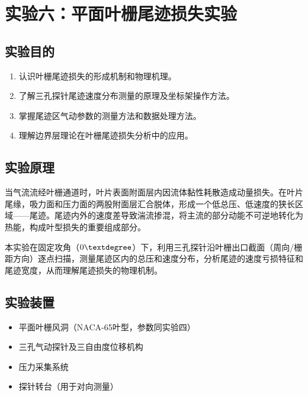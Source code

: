 
\section{实验六：平面叶栅尾迹损失实验}

\subsection{实验目的}

\begin{enumerate}
    \item 认识叶栅尾迹损失的形成机制和物理机理。
    \item 了解三孔探针尾迹速度分布测量的原理及坐标架操作方法。
    \item 掌握尾迹区气动参数的测量方法和数据处理方法。
    \item 理解边界层理论在叶栅尾迹损失分析中的应用。
\end{enumerate}

\subsection{实验原理}

当气流流经叶栅通道时，叶片表面附面层内因流体黏性耗散造成动量损失。在叶片尾缘，吸力面和压力面的两股附面层汇合脱体，形成一个低总压、低速度的狭长区域——尾迹。尾迹内外的速度差导致湍流掺混，将主流的部分动能不可逆地转化为热能，构成叶型损失的重要组成部分。

本实验在固定攻角（$0\textdegree$）下，利用三孔探针沿叶栅出口截面（周向/栅距方向）逐点扫描，测量尾迹区内的总压和速度分布，分析尾迹的速度亏损特征和尾迹宽度，从而理解尾迹损失的物理机制。

\subsection{实验装置}

\begin{itemize}
    \item 平面叶栅风洞（NACA-65叶型，参数同实验四）
    \item 三孔气动探针及三自由度位移机构
    \item 压力采集系统
    \item 探针转台（用于对向测量）
\end{itemize}

